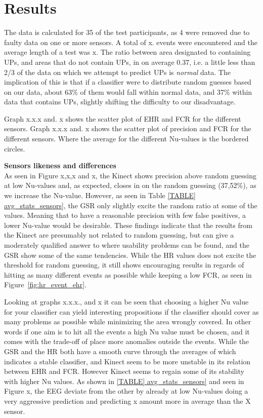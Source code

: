 \section{Results}
The data is calculated for 35 of the test participants, as 4 were removed due to faulty data on one or more sensors.	
A total of x. events were encountered and the average length of a test was x.
The ratio between area designated to containing UPs, and areas that do not contain UPs, in on average 0.37, i.e. a
little less than 2/3 of the data on which we attempt to predict UPs is \textit{normal} data. The implication of this is
that if a classifier were to distribute random guesses based on our data, about 63\% of them would fall within normal
data, and 37\% within data that contains UPs, slightly shifting the difficulty to our disadvantage.

Graph x.x.x and. x shows the scatter plot of EHR and FCR for the different sensors. 
Graph x.x.x and. x shows the scatter plot of precision and FCR for the different sensors. Where the average for the different Nu-values is the bordered circles.

\textbf{Sensors likeness and differences}\\
As seen in Figure x,x,x and x, the Kinect shows precision above random guessing at low Nu-values and,
as expected, closes in on the random guessing (37,52\%), as we increase the Nu-value. However, as seen in Table
\ref{TABLE] avg_stats_sensors}, the GSR only slightly excite the random ratio at some of the values. Meaning that
to have a reasonable precision with few false positives, a lower Nu-value would be desirable.
These findings indicate that the results from the Kinect are presumably not related to random guessing, but can give a moderately qualified answer to where usability problems can be found, and the GSR show some of the same tendencies.
While the HR values does not excite the threshold for random guessing, it still shows encouraging results in regards of hitting as many different events as possible while keeping a low FCR, as seen in Figure~\ref{fig:hr_event_ehr}.



Looking at graphs x.x.x., and x it can be seen that choosing a higher Nu value for your classifier can yield interesting propositions if the classifier should cover as many problems as possible while minimizing the area wrongly covered.
In other words if one aim is to hit all the events a high Nu value must be chosen, and it comes with the trade-off of place more anomalies outside the events. 
While the GSR and the HR both have a smooth curve through the averages of which indicates a stable classifier, and Kinect seem to be more unstable in its relation between EHR and FCR. However Kinect seems to regain some of its stability with higher Nu values. As shown in \ref{TABLE] avg_stats_sensors} and seen in Figure x, the EEG deviate from the other by already at low Nu-values doing a very aggressive prediction and predicting x amount more in average than the X sensor.

